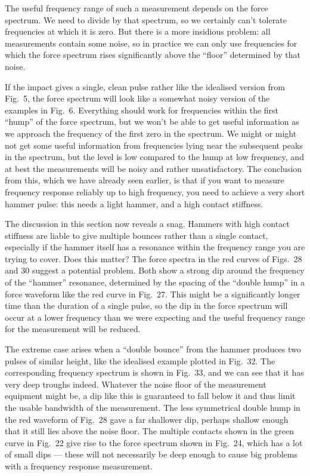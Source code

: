  The useful frequency range of such a measurement depends on the force 
  spectrum. We need to divide by that spectrum, so we certainly can’t tolerate 
  frequencies at which it is zero. But there is a more insidious problem: all 
  measurements contain some noise, so in practice we can only use frequencies 
  for which the force spectrum rises significantly above the “floor” determined 
  by that noise. 

  If the impact gives a single, clean pulse rather like the idealised version 
  from Fig.\ 5, the force spectrum will look like a somewhat noisy version of 
  the examples in Fig.\ 6. Everything should work for frequencies within the 
  first “hump” of the force spectrum, but we won’t be able to get useful 
  information as we approach the frequency of the first zero in the spectrum. 
  We might or might not get some useful information from frequencies lying near 
  the subsequent peaks in the spectrum, but the level is low compared to the 
  hump at low frequency, and at best the measurements will be noisy and rather 
  unsatisfactory. The conclusion from this, which we have already seen earlier, 
  is that if you want to measure frequency response reliably up to high 
  frequency, you need to achieve a very short hammer pulse: this needs a light 
  hammer, and a high contact stiffness. 

  The discussion in this section now reveals a snag. Hammers with high contact 
  stiffness are liable to give multiple bounces rather than a single contact, 
  especially if the hammer itself has a resonance within the frequency range 
  you are trying to cover. Does this matter? The force spectra in the red 
  curves of Figs.\ 28 and 30 suggest a potential problem. Both show a strong 
  dip around the frequency of the “hammer” resonance, determined by the spacing 
  of the “double hump” in a force waveform like the red curve in Fig.\ 27. This 
  might be a significantly longer time than the duration of a single pulse, so 
  the dip in the force spectrum will occur at a lower frequency than we were 
  expecting and the useful frequency range for the measurement will be reduced. 

  The extreme case arises when a “double bounce” from the hammer produces two 
  pulses of similar height, like the idealised example plotted in Fig.\ 32. The 
  corresponding frequency spectrum is shown in Fig.\ 33, and we can see that it 
  has very deep troughs indeed. Whatever the noise floor of the measurement 
  equipment might be, a dip like this is guaranteed to fall below it and thus 
  limit the usable bandwidth of the measurement. The less symmetrical double 
  hump in the red waveform of Fig.\ 28 gave a far shallower dip, perhaps 
  shallow enough that it still lies above the noise floor. The multiple 
  contacts shown in the green curve in Fig.\ 22 give rise to the force spectrum 
  shown in Fig.\ 24, which has a lot of small dips --- these will not 
  necessarily be deep enough to cause big problems with a frequency response 
  measurement. 

